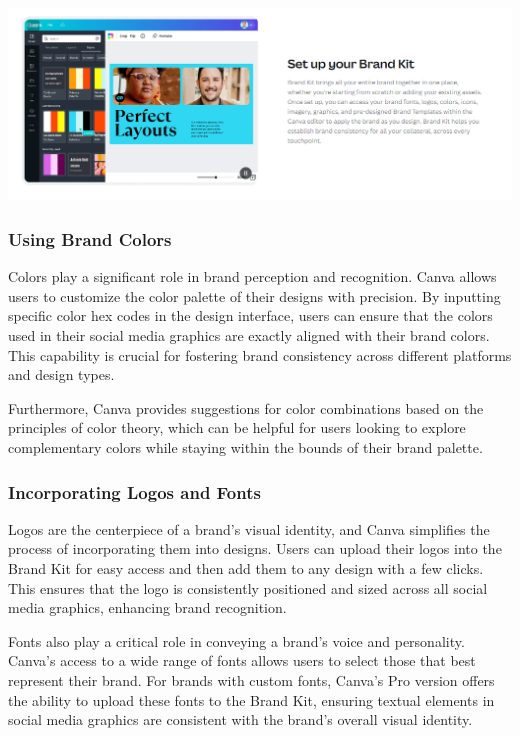 \documentclass[
]{book}
\begin{document}
\href{https://www.canva.com/pro/brand-kit/}{\includegraphics[width=1\textwidth,height=\textheight]{images/clipboard-658121144.png}}

\hypertarget{using-brand-colors}{%
\subsubsection*{Using Brand Colors}\label{using-brand-colors}}

Colors play a significant role in brand perception and recognition. Canva allows users to customize the color palette of their designs with precision. By inputting specific color hex codes in the design interface, users can ensure that the colors used in their social media graphics are exactly aligned with their brand colors. This capability is crucial for fostering brand consistency across different platforms and design types.

Furthermore, Canva provides suggestions for color combinations based on the principles of color theory, which can be helpful for users looking to explore complementary colors while staying within the bounds of their brand palette.

\hypertarget{incorporating-logos-and-fonts}{%
\subsubsection*{Incorporating Logos and Fonts}\label{incorporating-logos-and-fonts}}

Logos are the centerpiece of a brand's visual identity, and Canva simplifies the process of incorporating them into designs. Users can upload their logos into the Brand Kit for easy access and then add them to any design with a few clicks. This ensures that the logo is consistently positioned and sized across all social media graphics, enhancing brand recognition.

Fonts also play a critical role in conveying a brand's voice and personality. Canva's access to a wide range of fonts allows users to select those that best represent their brand. For brands with custom fonts, Canva's Pro version offers the ability to upload these fonts to the Brand Kit, ensuring textual elements in social media graphics are consistent with the brand's overall visual identity.
\end{document}
